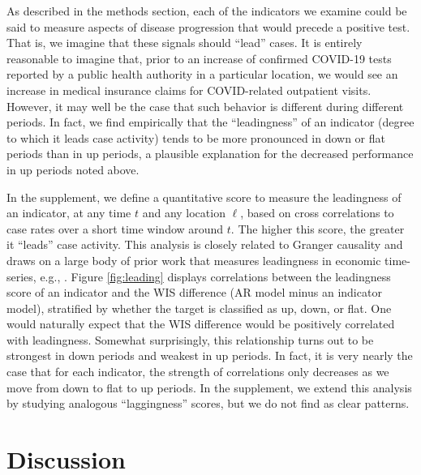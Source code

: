 \documentclass[9pt,twocolumn,twoside,lineno]{pnas-new}
\begin{document}
As described in the methods section, each of the indicators we examine could be
said to measure aspects of disease progression that would precede a positive
test. That is, we imagine that these signals should ``lead'' cases. It is
entirely reasonable to imagine that, prior to an increase of confirmed COVID-19
tests reported by a public health authority in a particular location, we would
see an increase in medical insurance claims for COVID-related outpatient
visits. However, it may well be the case that such behavior is different
during different periods. In fact, we find empirically that the ``leadingness''
of an indicator (degree to which it leads case activity) tends to be more
pronounced in down or flat periods than in up periods, a plausible explanation 
for the decreased performance in up periods noted above.

In the supplement, we define a quantitative score to measure the 
leadingness of an indicator, at any time $t$ and any location $\ell$, based on 
cross correlations to case rates over a short time window around $t$.
The higher this score, the greater it ``leads'' case activity. This analysis is
closely related to Granger causality \cite{engle1987a} and draws on a large
body of prior work that measures leadingness in economic time-series, e.g., 
\cite{mitchell1938a, koopmans1947a, shiskin1968a, granger1969a, yeats1972a, 
  sargent1977a, auerbach1982a, koch1988a, StockWatson1989, diebold1989a,
  lahiri1991a, emerson1996a, hamilton1996a}. Figure \ref{fig:leading} displays
correlations between the leadingness score of an indicator and the WIS
difference (AR model minus an indicator model), stratified by whether the target
is classified as up, down, or flat.  One would naturally expect that the WIS
difference would be positively correlated with leadingness.  Somewhat
surprisingly, this relationship turns out to be strongest in down periods and
weakest in up periods.  In fact, it is very nearly the case that for each
indicator, the strength of correlations only decreases as we move from down to
flat to up periods.  In the supplement, we extend this analysis by studying
analogous ``laggingness'' scores, but we do not find as clear patterns.

\section{Discussion}
\end{document}
